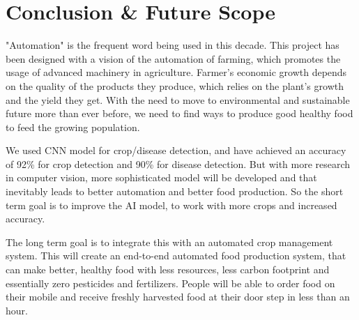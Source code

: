 \documentclass[../Report.tex]{subfiles}
\begin{document}
\chapter{Conclusion \& Future Scope}
"Automation" is the frequent word being used in this decade. This project has been designed with a vision of the automation of farming, 
which promotes the usage of advanced machinery in agriculture. Farmer's economic growth depends on the quality of the products they produce, 
which relies on the plant's growth and the yield they get. With the need to move to environmental and sustainable future more than ever 
before, we need to find ways to produce good healthy food to feed the growing population. \par

We used CNN model for crop/disease detection, and have achieved an accuracy of 92\% for crop detection and 90\% for disease detection. But 
with more research in computer vision, more sophisticated model will be developed and that inevitably leads to better automation and better
food production. So the short term goal is to improve the AI model, to work with more crops and increased accuracy. \par

The long term goal is to integrate this with an automated crop management system. This will create an end-to-end automated food production
system, that can make better, healthy food with less resources, less carbon footprint and essentially zero pesticides and fertilizers. 
People will be able to order food on their mobile and receive freshly harvested food at their door step in less than an hour.
\end{document}
